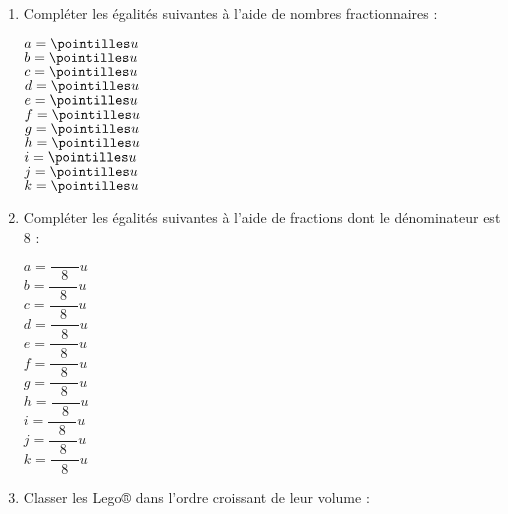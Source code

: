 \begin{activite}
\begin{QCM}
         \begin{enumerate}
            \item Compléter les égalités suivantes à l'aide de nombres fractionnaires : \\ [-3mm]
               \begin{multicols}{6}
                  $a = \pointilles u$ \\ [7mm]
                  $b = \pointilles u$ \\ [7mm]
                  $c = \pointilles u$ \\ [7mm]
                  $d = \pointilles u$ \\ [7mm]
                  $e = \pointilles u$ \\ [7mm]
                  $f = \pointilles u$ \\ [7mm]
                  $g = \pointilles u$ \\ [7mm]
                  $h = \pointilles u$ \\ [7mm]
                  $i = \pointilles u$ \\ [7mm]
                  $j = \pointilles u$ \\ [7mm]
                  $k = \pointilles u$ \\ [7mm]
               \end{multicols} \medskip
            \item Compléter les égalités suivantes à l'aide de fractions dont le dénominateur est 8 : \\ [-3mm]
               \begin{multicols}{6}
                  $a = \dfrac{\qquad}{8} u$ \\ [7mm]
                  $b = \dfrac{\qquad}{8} u$ \\ [7mm]
                  $c = \dfrac{\qquad}{8} u$ \\ [7mm]
                  $d = \dfrac{\qquad}{8} u$ \\ [7mm]
                  $e = \dfrac{\qquad}{8} u$ \\ [7mm]
                  $f = \dfrac{\qquad}{8} u$ \\ [7mm]
                  $g = \dfrac{\qquad}{8} u$ \\ [7mm]
                  $h = \dfrac{\qquad}{8} u$ \\ [7mm]
                  $i = \dfrac{\qquad}{8} u$ \\ [7mm]
                  $j = \dfrac{\qquad}{8} u$ \\ [7mm]
                  $k = \dfrac{\qquad}{8} u$ \\ [7mm]
               \end{multicols} \smallskip
            \item Classer les Lego® dans l'ordre croissant de leur volume : \par \medskip
               \pointilles
      \end{enumerate}
   \end{QCM}
\end{activite}


